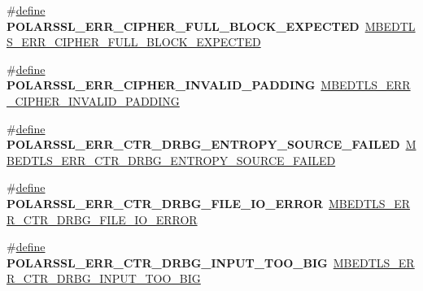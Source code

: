\begin{DoxyCompactItemize}
\item 
\mbox{\label{compat-1_83_8h_ae92e3caeb14ac7b0a3ac63aa49d88e9e}} 
\#\hyperlink{structdefine}{define} {\bfseries P\+O\+L\+A\+R\+S\+S\+L\+\_\+\+E\+R\+R\+\_\+\+C\+I\+P\+H\+E\+R\+\_\+\+F\+U\+L\+L\+\_\+\+B\+L\+O\+C\+K\+\_\+\+E\+X\+P\+E\+C\+T\+ED}~\hyperlink{cipher_8h_ac7da041aba839f2ba606eb30f7547b8b}{M\+B\+E\+D\+T\+L\+S\+\_\+\+E\+R\+R\+\_\+\+C\+I\+P\+H\+E\+R\+\_\+\+F\+U\+L\+L\+\_\+\+B\+L\+O\+C\+K\+\_\+\+E\+X\+P\+E\+C\+T\+ED}
\item 
\mbox{\label{compat-1_83_8h_a87777f84d48de3a0d48b252d85c8adc3}} 
\#\hyperlink{structdefine}{define} {\bfseries P\+O\+L\+A\+R\+S\+S\+L\+\_\+\+E\+R\+R\+\_\+\+C\+I\+P\+H\+E\+R\+\_\+\+I\+N\+V\+A\+L\+I\+D\+\_\+\+P\+A\+D\+D\+I\+NG}~\hyperlink{cipher_8h_a06295349279dcbda6b1317924d5bb810}{M\+B\+E\+D\+T\+L\+S\+\_\+\+E\+R\+R\+\_\+\+C\+I\+P\+H\+E\+R\+\_\+\+I\+N\+V\+A\+L\+I\+D\+\_\+\+P\+A\+D\+D\+I\+NG}
\item 
\mbox{\label{compat-1_83_8h_a29337787324ee83801279c2bb3debfb3}} 
\#\hyperlink{structdefine}{define} {\bfseries P\+O\+L\+A\+R\+S\+S\+L\+\_\+\+E\+R\+R\+\_\+\+C\+T\+R\+\_\+\+D\+R\+B\+G\+\_\+\+E\+N\+T\+R\+O\+P\+Y\+\_\+\+S\+O\+U\+R\+C\+E\+\_\+\+F\+A\+I\+L\+ED}~\hyperlink{ctr__drbg_8h_a15d1931ea5d133062cd93a3374a5bcf0}{M\+B\+E\+D\+T\+L\+S\+\_\+\+E\+R\+R\+\_\+\+C\+T\+R\+\_\+\+D\+R\+B\+G\+\_\+\+E\+N\+T\+R\+O\+P\+Y\+\_\+\+S\+O\+U\+R\+C\+E\+\_\+\+F\+A\+I\+L\+ED}
\item 
\mbox{\label{compat-1_83_8h_ac24b26db879708ddef6840f37a1c94aa}} 
\#\hyperlink{structdefine}{define} {\bfseries P\+O\+L\+A\+R\+S\+S\+L\+\_\+\+E\+R\+R\+\_\+\+C\+T\+R\+\_\+\+D\+R\+B\+G\+\_\+\+F\+I\+L\+E\+\_\+\+I\+O\+\_\+\+E\+R\+R\+OR}~\hyperlink{ctr__drbg_8h_ab5f1b73efeca5de8e75c273d47b8274e}{M\+B\+E\+D\+T\+L\+S\+\_\+\+E\+R\+R\+\_\+\+C\+T\+R\+\_\+\+D\+R\+B\+G\+\_\+\+F\+I\+L\+E\+\_\+\+I\+O\+\_\+\+E\+R\+R\+OR}
\item 
\mbox{\label{compat-1_83_8h_ad2ebdb67b7c42e990590e1b5d6cbadf4}} 
\#\hyperlink{structdefine}{define} {\bfseries P\+O\+L\+A\+R\+S\+S\+L\+\_\+\+E\+R\+R\+\_\+\+C\+T\+R\+\_\+\+D\+R\+B\+G\+\_\+\+I\+N\+P\+U\+T\+\_\+\+T\+O\+O\+\_\+\+B\+IG}~\hyperlink{ctr__drbg_8h_a7367c2feaa7ee9f4f182ff1cb03a864e}{M\+B\+E\+D\+T\+L\+S\+\_\+\+E\+R\+R\+\_\+\+C\+T\+R\+\_\+\+D\+R\+B\+G\+\_\+\+I\+N\+P\+U\+T\+\_\+\+T\+O\+O\+\_\+\+B\+IG}

\end{DoxyCompactItemize}
